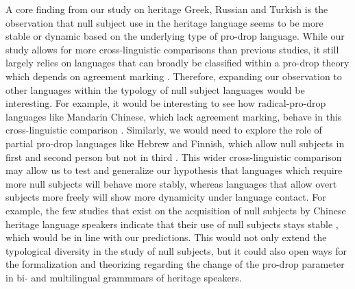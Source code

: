 \documentclass[output=paper,colorlinks,citecolor=brown]{langscibook}
\begin{document}
A core finding from our study on heritage Greek, Russian and Turkish is the observation that null subject use in the heritage language seems to be more stable or dynamic based on the underlying type of pro-drop language. While our study allows for more cross-linguistic comparisons than previous studies, it still largely relies on languages that can broadly be classified within a pro-drop theory which depends on agreement marking \parencite{rizzi1986null}. Therefore, expanding our observation to other languages within the typology of null subject languages would be interesting. For example, it would be interesting to see how radical-pro-drop languages like Mandarin Chinese, which lack agreement marking, behave in this cross-linguistic comparison \parencite{neeleman2007radical}. Similarly, we would need to explore the role of partial pro-drop languages like Hebrew and Finnish, which allow null subjects in first and second person but not in third \parencite{camacho2013null}. This wider cross-linguistic comparison may allow us to test and generalize our hypothesis that languages which require more null subjects will behave more stably, whereas languages that allow overt subjects more freely will show more dynamicity under language contact. For example, the few studies that exist on the acquisition of null subjects by Chinese heritage language speakers indicate that their use of null subjects stays stable \parencite{chou2020acquisition, zhang2021language}, which would be in line with our predictions. This would not only extend the typological diversity in the study of null subjects, but it could also open ways for the formalization and theorizing regarding the change of the pro-drop parameter in bi- and multilingual grammmars of heritage speakers. 
\end{document}
